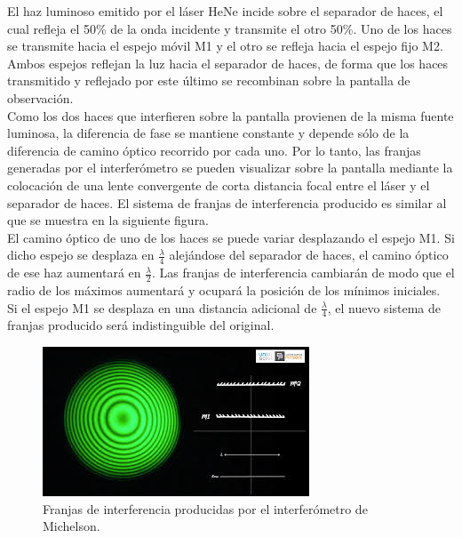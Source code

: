 \documentclass[13,twocolumn,letterpaper]{article}
\begin{document}
El haz luminoso emitido por el láser HeNe incide sobre el separador de haces, el cual refleja el 50\% de la onda incidente y transmite el otro 50\%. Uno de los haces se transmite hacia el espejo móvil M1 y el otro se refleja hacia el espejo fijo M2. Ambos espejos reflejan la luz hacia el separador de haces, de forma que los haces transmitido y reflejado por este último se recombinan sobre la pantalla de observación. \\

Como los dos haces que interfieren sobre la pantalla provienen de la misma fuente luminosa, la diferencia de fase se mantiene constante y depende sólo de la diferencia de camino óptico recorrido por cada uno. Por lo tanto, las franjas generadas por el interferómetro se pueden visualizar sobre la pantalla mediante la colocación de una lente convergente de corta distancia focal entre el láser y el separador de haces.  El sistema de franjas de interferencia producido es similar al que se muestra en la siguiente figura.\\

El camino óptico de uno de los haces se puede variar desplazando el espejo M1. Si dicho espejo se desplaza en $\frac{\lambda}{4}$ alejándose del separador de haces, el camino óptico de ese haz aumentará en $\frac{\lambda}{2}$. Las franjas de interferencia cambiarán de modo que el radio de los máximos aumentará y ocupará la posición de los mínimos iniciales. 
\\
Si el espejo M1 se desplaza en una distancia adicional de  $\frac{\lambda}{4}$, el nuevo sistema de franjas producido será indistinguible del original. 
 
\begin{figure}[h]
	\centering
\includegraphics[width=\linewidth]{fig2.jpg}
\caption{Franjas de interferencia producidas por el interferómetro de Michelson. }
	\label{fig:fig2}
\end{figure}
\end{document}
